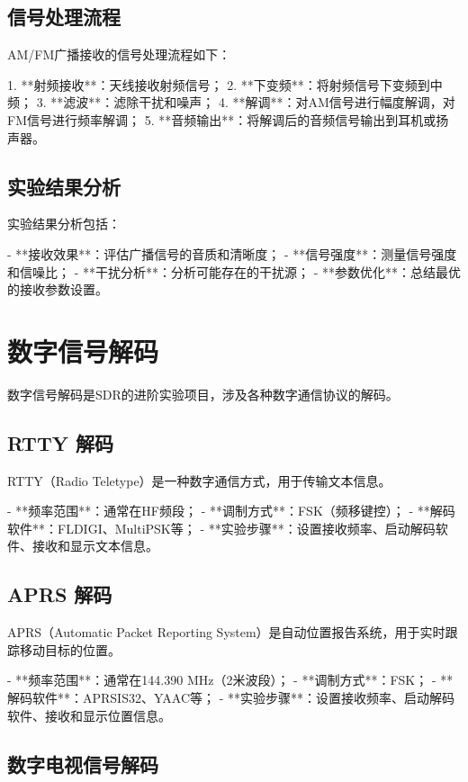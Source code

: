 ﻿\documentclass[UTF8]{ctexbook}
\begin{document}
\subsection{信号处理流程}

AM/FM广播接收的信号处理流程如下：

1. **射频接收**：天线接收射频信号；
2. **下变频**：将射频信号下变频到中频；
3. **滤波**：滤除干扰和噪声；
4. **解调**：对AM信号进行幅度解调，对FM信号进行频率解调；
5. **音频输出**：将解调后的音频信号输出到耳机或扬声器。

\subsection{实验结果分析}

实验结果分析包括：

- **接收效果**：评估广播信号的音质和清晰度；
- **信号强度**：测量信号强度和信噪比；
- **干扰分析**：分析可能存在的干扰源；
- **参数优化**：总结最优的接收参数设置。

\section{数字信号解码}

数字信号解码是SDR的进阶实验项目，涉及各种数字通信协议的解码。

\subsection{RTTY 解码}

RTTY（Radio Teletype）是一种数字通信方式，用于传输文本信息。

- **频率范围**：通常在HF频段；
- **调制方式**：FSK（频移键控）；
- **解码软件**：FLDIGI、MultiPSK等；
- **实验步骤**：设置接收频率、启动解码软件、接收和显示文本信息。

\subsection{APRS 解码}

APRS（Automatic Packet Reporting System）是自动位置报告系统，用于实时跟踪移动目标的位置。

- **频率范围**：通常在144.390 MHz（2米波段）；
- **调制方式**：FSK；
- **解码软件**：APRSIS32、YAAC等；
- **实验步骤**：设置接收频率、启动解码软件、接收和显示位置信息。

\subsection{数字电视信号解码}
\end{document}

